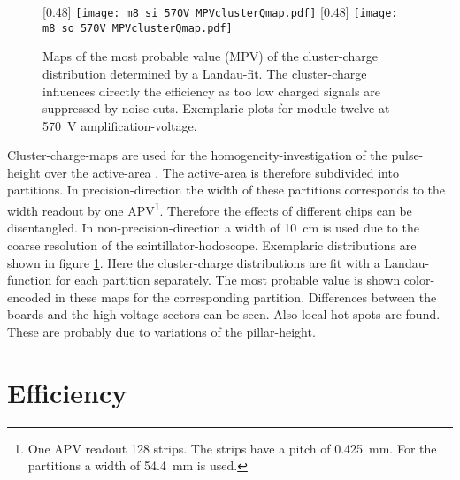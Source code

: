 \documentclass[
twoside,            %
BCOR1.4cm,          %
10pt,               %
headings=normal,    %
headsepline,        %
clearplainpage,		%
final,              %
div=14,
open=right,
bibliography=toc
]{scrreprt}
\begin{document}
\begin{figure}[!h]
	\centering
	[0.48\textwidth]
	{\texttt{[image: m8\_si\_570V\_MPVclusterQmap.pdf]}}
	\hfill
	[0.48\textwidth]
	{\texttt{[image: m8\_so\_570V\_MPVclusterQmap.pdf]}}
	\vspace{-2mm}
	\caption{
		Maps of the most probable value (MPV) of the cluster-charge distribution determined by a Landau-fit.
		The cluster-charge influences directly the efficiency as too low charged signals are suppressed by noise-cuts.
		Exemplaric plots for module twelve at \SI{570}{V} amplification-voltage.
	}
	\label{gainMap}
\end{figure}

Cluster-charge-maps are used for the homogeneity-investigation of the pulse-height over the active-area \cite{loeselThesis}.
The active-area is therefore subdivided into partitions.
In precision-direction the width of these partitions corresponds to the width readout by one APV\footnote{
	One APV readout 128 strips. 
	The strips have a pitch of \SI{0.425}{mm}.
	For the partitions a width of \SI{54.4}{mm} is used.
}.
Therefore the effects of different chips can be disentangled.
In non-precision-direction a width of \SI{10}{cm} is used due to the coarse resolution of the scintillator-hodoscope.
Exemplaric distributions are shown in figure \ref{gainMap}.
Here the cluster-charge distributions are fit with a Landau-function for each partition separately.
The most probable value is shown color-encoded in these maps for the corresponding partition.
Differences between the boards and the high-voltage-sectors can be seen.
Also local hot-spots are found.
These are probably due to variations of the pillar-height.

\section{Efficiency}
\label{efficiency}
\end{document}
